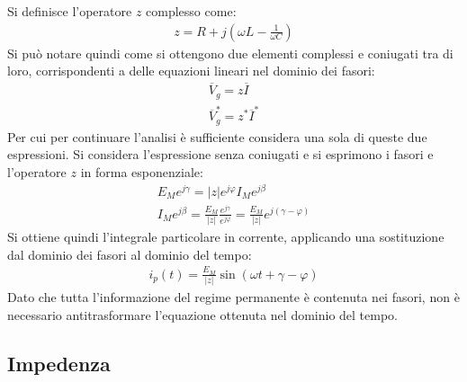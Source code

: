 \documentclass{article}
\numberwithin{equation}{subsection}
\begin{document}
Si definisce l'operatore $z$ complesso come:
\begin{gather}
    z=R+j\left(\omega L-\displaystyle\frac{1}{\omega C}\right)
\end{gather}
Si può notare quindi come si ottengono due elementi complessi e coniugati tra di loro, corrispondenti a delle equazioni lineari nel dominio dei fasori:
\begin{gather*}
    \overline{V}_g=z\overline{I}\\
    \overline{V}_g^*=z^*\overline{I}^*
\end{gather*}
Per cui per continuare l'analisi è sufficiente considera una sola di queste due espressioni. Si considera l'espressione senza coniugati e si esprimono i fasori e l'operatore 
$z$ in forma esponenziale:
\begin{gather*}
    E_Me^{j\gamma}=|z|e^{j\varphi}I_Me^{j\beta}\\
    I_Me^{j\beta}=\displaystyle\frac{E_M}{|z|}\frac{e^{j\gamma}}{e^{j\varphi}}=\frac{E_M}{|z|}e^{j(\gamma-\varphi)}
\end{gather*} 
Si ottiene quindi l'integrale particolare in corrente, applicando una sostituzione dal dominio dei fasori al dominio del tempo:
\begin{gather*}
    i_p(t)=\displaystyle\frac{E_M}{|z|}\sin(\omega t+\gamma-\varphi)
\end{gather*}
Dato che tutta l'informazione del regime permanente è contenuta nei fasori, non è necessario antitrasformare l'equazione ottenuta nel dominio del tempo. 

\subsection{Impedenza}
\end{document}
